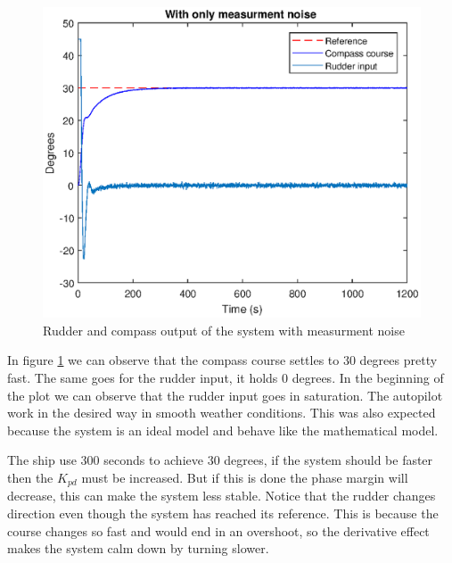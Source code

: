 \begin{figure}[H]
    \centering
    \includegraphics[width=0.6\linewidth]{Part3_pics/ny_3b.eps}
    \caption{Rudder and compass output of the system with measurment noise}
    \label{fig:p3b}
\end{figure}
In figure \ref{fig:p3b} we can observe that the compass course settles to 30 degrees pretty fast. The same goes for the rudder input, it holds 0 degrees. In the beginning of the plot we can observe that the rudder input goes in saturation. The autopilot work in the desired way in smooth weather conditions. This was also expected because the system is an ideal model and behave like the mathematical model. 

The ship use 300 seconds to achieve 30 degrees, if the system should be faster then the $K_{pd}$ must be increased. But if this is done the phase margin will decrease, this can make the system less stable. Notice that the rudder changes direction even though the system has reached its reference. This is because the course changes so fast and would end in an overshoot, so the derivative effect makes the system calm down by turning slower.



